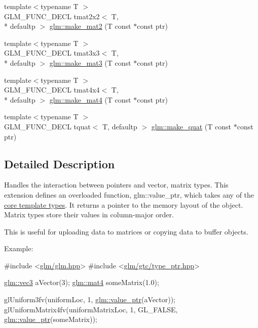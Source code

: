 \begin{DoxyCompactItemize}
\item 
{\footnotesize template$<$typename T $>$ }\\G\-L\-M\-\_\-\-F\-U\-N\-C\-\_\-\-D\-E\-C\-L tmat2x2$<$ T, \\*
defaultp $>$ \hyperlink{group__gtc__type__ptr_ga52a16e333fef7e33ca740779482a8693}{glm\-::make\-\_\-mat2} (T const $\ast$const ptr)
\item 
{\footnotesize template$<$typename T $>$ }\\G\-L\-M\-\_\-\-F\-U\-N\-C\-\_\-\-D\-E\-C\-L tmat3x3$<$ T, \\*
defaultp $>$ \hyperlink{group__gtc__type__ptr_gac2bc10c519ffc8db9e24f325f23787ea}{glm\-::make\-\_\-mat3} (T const $\ast$const ptr)
\item 
{\footnotesize template$<$typename T $>$ }\\G\-L\-M\-\_\-\-F\-U\-N\-C\-\_\-\-D\-E\-C\-L tmat4x4$<$ T, \\*
defaultp $>$ \hyperlink{group__gtc__type__ptr_ga2c6e6d457cb932e1ce683e4f690a6f60}{glm\-::make\-\_\-mat4} (T const $\ast$const ptr)
\item 
{\footnotesize template$<$typename T $>$ }\\G\-L\-M\-\_\-\-F\-U\-N\-C\-\_\-\-D\-E\-C\-L tquat$<$ T, defaultp $>$ \hyperlink{group__gtc__type__ptr_gaadafb6600af2633e4c98cc64c72f5269}{glm\-::make\-\_\-quat} (T const $\ast$const ptr)
\end{DoxyCompactItemize}


\subsection{Detailed Description}
Handles the interaction between pointers and vector, matrix types. This extension defines an overloaded function, glm\-::value\-\_\-ptr, which takes any of the \hyperlink{group__core__template}{core template types}. It returns a pointer to the memory layout of the object. Matrix types store their values in column-\/major order.

This is useful for uploading data to matrices or copying data to buffer objects.

Example\-: 
\begin{DoxyCode}
\textcolor{preprocessor}{#include <\hyperlink{glm_8hpp}{glm/glm.hpp}>}
\textcolor{preprocessor}{#include <\hyperlink{type__ptr_8hpp}{glm/gtc/type\_ptr.hpp}>}

\hyperlink{structglm_1_1tvec3}{glm::vec3} aVector(3);
\hyperlink{structglm_1_1tmat4x4}{glm::mat4} someMatrix(1.0);

glUniform3fv(uniformLoc, 1, \hyperlink{group__gtc__type__ptr_gaf019636bb8bd7c9efb7c7ce3bb23bcfc}{glm::value\_ptr}(aVector));
glUniformMatrix4fv(uniformMatrixLoc, 1, GL\_FALSE, \hyperlink{group__gtc__type__ptr_gaf019636bb8bd7c9efb7c7ce3bb23bcfc}{glm::value\_ptr}(someMatrix));
\end{DoxyCode}


